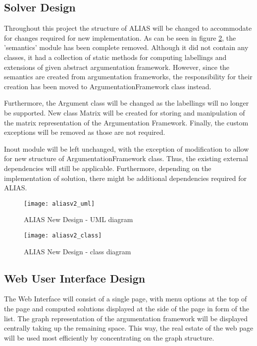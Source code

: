 \subsection{Solver Design}
Throughout this project the structure of ALIAS will be changed to accommodate for changes required for new implementation. As can be seen in figure \ref{fig:aliasUml2}, the 'semantics' module has been complete removed. Although it did not contain any classes, it had a collection of static methods for computing labellings and extensions of given abstract argumentation framework. However, since the semantics are created from argumentation frameworks, the responsibility for their creation has been moved to ArgumentationFramework class instead. 

Furthermore, the Argument class will be changed as the labellings will no longer be supported. New class Matrix will be created for storing and manipulation of the matrix representation of the Argumentation Framework. Finally, the custom exceptions will be removed as those are not required.

Inout module will be left unchanged, with the exception of modification to allow for new structure of ArgumentationFramework class. Thus, the existing external dependencies will still be applicable. Furthermore, depending on the implementation of solution, there might be additional dependencies required for ALIAS.

\begin{figure}[h]
	\texttt{[image: aliasv2\_uml]}
	\caption{ALIAS New Design - UML diagram}
	\label{fig:aliasUml2}
\end{figure}

\begin{figure}[h]
	\texttt{[image: aliasv2\_class]}
	\caption{ALIAS New Design - class diagram}
	\label{fig:aliasUml2}
\end{figure}

\subsection{Web User Interface Design}
The Web Interface will consist of a single page, with menu options at the top of the page and computed solutions displayed at the side of the page in form of the list. The graph representation of the argumentation framework will be displayed centrally taking up the remaining space. This way, the real estate of the web page will be used most efficiently by concentrating on the graph structure. 

